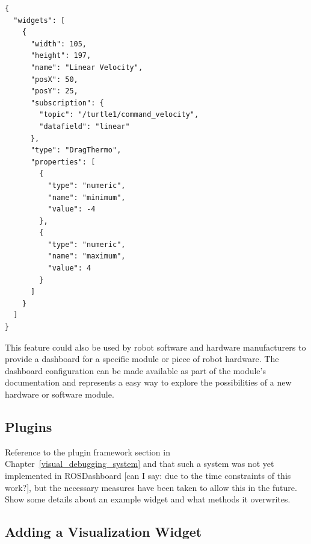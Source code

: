 \begin{lstlisting}[frame=single,caption={Example dashboard configuration in JSON.},label=json_example]
{
  "widgets": [
    {
      "width": 105,
      "height": 197,
      "name": "Linear Velocity",
      "posX": 50,
      "posY": 25,
      "subscription": {
        "topic": "/turtle1/command_velocity",
        "datafield": "linear"
      },
      "type": "DragThermo",
      "properties": [
        {
          "type": "numeric",
          "name": "minimum",
          "value": -4
        },
        {
          "type": "numeric",
          "name": "maximum",
          "value": 4
        }
      ]
    }
  ]
}
\end{lstlisting}

This feature could also be used by robot software and hardware manufacturers to provide a dashboard for a specific module or piece of robot hardware. The dashboard configuration can be made available as part of the module's documentation and represents a easy way to explore the possibilities of a new hardware or software module.

\subsection{Plugins}
Reference to the plugin framework section in Chapter~\ref{visual_debugging_system} and that such a system was not yet implemented in ROSDashboard [can I say: due to the time constraints of this work?], but the necessary measures have been taken to allow this in the future. Show some details about an example widget and what methods it overwrites.

\subsection{Adding a Visualization Widget}


